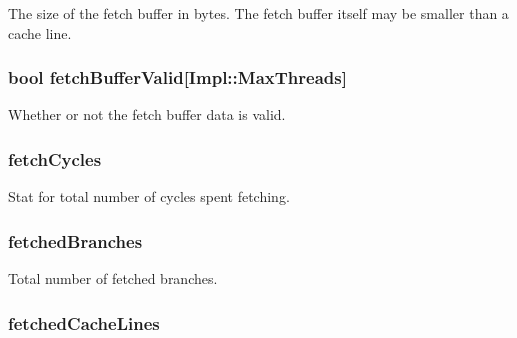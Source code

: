 \label{classDefaultFetch_ac47806923c3481b83636c4aa03d184f8}
The size of the fetch buffer in bytes. The fetch buffer itself may be smaller than a cache line. \hypertarget{classDefaultFetch_ab6845c7b94805ded9ea7d94b210be51b}{
\subsubsection[{fetchBufferValid}]{\setlength{\rightskip}{0pt plus 5cm}bool {\bf fetchBufferValid}\mbox{[}Impl::MaxThreads\mbox{]}}}
\label{classDefaultFetch_ab6845c7b94805ded9ea7d94b210be51b}
Whether or not the fetch buffer data is valid. \hypertarget{classDefaultFetch_a9699b5489dd499e832651b96f95b5d19}{
\subsubsection[{fetchCycles}]{ {\bf fetchCycles}}}
\label{classDefaultFetch_a9699b5489dd499e832651b96f95b5d19}
Stat for total number of cycles spent fetching. \hypertarget{classDefaultFetch_aaca0646636cde96795aed6beb2942975}{
\subsubsection[{fetchedBranches}]{ {\bf fetchedBranches}}}
\label{classDefaultFetch_aaca0646636cde96795aed6beb2942975}
Total number of fetched branches. \hypertarget{classDefaultFetch_a0ead660daa133edcd64ac552d473ebba}{
\subsubsection[{fetchedCacheLines}]{ {\bf fetchedCacheLines}}}
